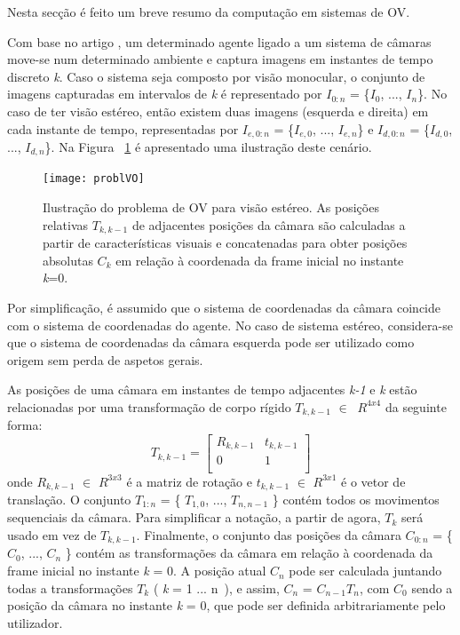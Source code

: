 Nesta secção é feito um breve resumo da computação em sistemas de OV.

Com base no artigo \cite{VOpart1}, um determinado agente ligado a um sistema de câmaras move-se num determinado ambiente e captura imagens em instantes de tempo discreto \textit{k}. Caso o sistema seja composto por visão monocular, o conjunto de imagens capturadas em intervalos de \textit{k} é representado por  \textit{$I_{0:n}$}  = \{\textit{$I_0$}, ..., \textit{$I_n$}\}. 
No caso de ter visão estéreo, então existem duas imagens (esquerda e direita) em cada instante de tempo, representadas por \textit{$I_{e,0:n}$} = \{\textit{$I_{e,0}$}, ..., \textit{$I_{e,n}$}\} e \textit{$I_{d,0:n}$} = \{\textit{$I_{d,0}$}, ..., \textit{$I_{d,n}$}\}. 
Na Figura ~\ref{fig:arch} é apresentado uma ilustração deste cenário. 


\begin{figure}[h!] %
	\begin{center}
		\leavevmode		
		\texttt{[image: problVO]}
		\caption{Ilustração do problema de OV para visão estéreo. As posições relativas $T_{k,k-1}$ de adjacentes posições da câmara são calculadas a partir de características visuais e concatenadas para obter posições absolutas $C_{k}$ em relação à coordenada da frame inicial no instante \textit{k}=0. \cite{VOpart1}}
		\label{fig:arch}
	\end{center}
\end{figure}

Por simplificação, é assumido que o sistema de coordenadas da câmara coincide com o sistema de coordenadas do agente. No caso de sistema estéreo, considera-se que o sistema de coordenadas da câmara esquerda pode ser utilizado como origem sem perda de aspetos gerais.

As posições de uma câmara em instantes de tempo adjacentes \textit{k-1} e \textit{k} estão relacionadas por uma transformação de corpo rígido $T_{k,k-1}$ $\in\ $ $R^{4x4}$ da seguinte forma: \[ T_{k,k-1} = \left[\begin{array}{cc} R_{k,k-1} & t_{k,k-1} \\  0 & 1 \\ \end{array} \right] \]
onde $R_{k,k-1}$ $\in$ $R^{3x3}$ é a matriz de rotação e $t_{k,k-1}$ $\in$ $R^{3x1}$ é o vetor de translação. O conjunto $T_{1:n}$ = \{ $T_{1,0}$, ..., $T_{n,n-1}$ \} contém todos os movimentos sequenciais da câmara. Para simplificar
a notação, a partir de agora, $T_k$ será usado em vez de $T_{k,k-1}$. Finalmente, o conjunto das posições da câmara $C_{0:n}$ = \{ $C_0$, ..., $C_n$ \} contém as transformações da câmara em relação à coordenada da frame inicial no instante \textit{k} = 0. A posição atual $C_n$ pode ser calculada juntando todas a transformações $T_k$ ( \textit{k} = 1 ... n\ ), e assim, $C_n$ = $C_{n-1}T_n$, com $C_0$ sendo a posição da câmara no instante \textit{k} = 0, que pode ser definida arbitrariamente pelo utilizador.

